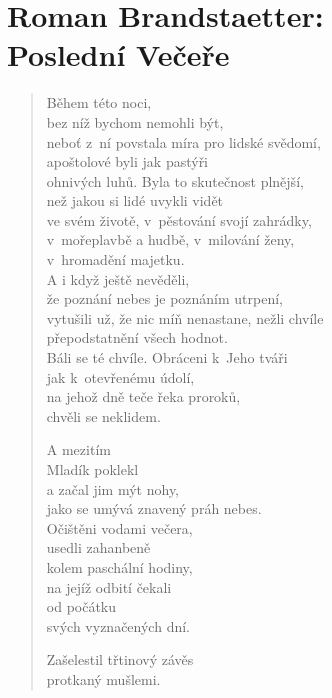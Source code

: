 \section{Roman Brandstaetter: \\ Poslední Večeře}

\begin{verse}

Během této noci, \\
bez níž bychom nemohli být, \\
neboť z ní povstala míra pro lidské svědomí,\\
apoštolové byli jak pastýři\\
ohnivých luhů. Byla to skutečnost plnější,\\
než jakou si lidé uvykli vidět\\
ve svém životě, v pěstování svojí zahrádky,\\
v mořeplavbě a hudbě, v milování ženy,\\
v hromadění majetku.\\
A i když ještě nevěděli,\\
že poznání nebes je poznáním utrpení,\\
vytušili už, že nic míň nenastane, nežli chvíle\\
přepodstatnění všech hodnot.\\
Báli se té chvíle. Obráceni k Jeho tváři\\
jak k otevřenému údolí,\\
na jehož dně teče řeka proroků,\\
chvěli se neklidem.

\medskip

A mezitím \\
Mladík poklekl \\
a začal jim mýt nohy, \\
jako se umývá znavený práh nebes. \\
Očištěni vodami večera, \\
usedli zahanbeně \\
kolem paschální hodiny, \\
na jejíž odbití čekali \\
od počátku  \\
svých vyznačených dní.

\medskip

Zašelestil třtinový závěs \\
protkaný mušlemi. \\

\medskip


\end{verse}

